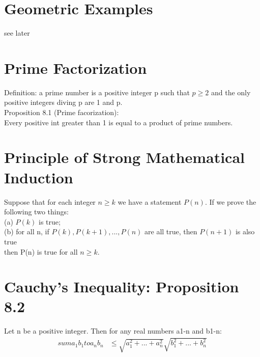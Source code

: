 \documentclass[12pt]{article}
\begin{document}
\section{Geometric Examples}
	see later
\section{Prime Factorization}
	Definition: a prime number is a positive integer p such that $ p \ge 2 $
	and the only positive integers diving p are 1 and p.\\
	Proposition 8.1 (Prime facorization):\\
	Every positive int greater than 1 is equal to a product of prime numbers.
\section{Principle of Strong Mathematical Induction}
	Suppose that for each integer $ n\ge k $ we have a statement $ P(n) $.
	If we prove the following two things: \\
	(a) $ P(k) $ is true;\\
	(b) for all n, if $ P(k), P(k+1),...,P(n) $ are all true, then $ P(n+1) $
	is also true \\
	then P(n) is true for all $ n\ge k $.
\section{Cauchy's Inequality: Proposition 8.2}
	Let n be a positive integer. Then for any real numbers a1-n and b1-n:
	\begin{align*}
		sum a_1b_1 to a_nb_n &\le \sqrt{a_1^2+...+a_n^2} \sqrt{b_1^2+...+b_n^2} 
	\end{align*}

	
\end{document}
